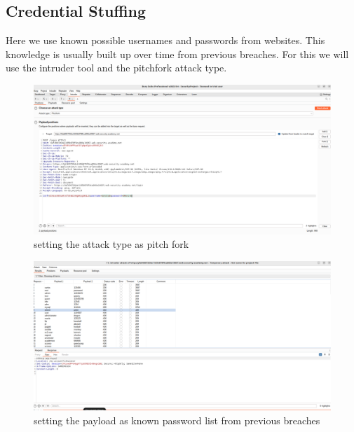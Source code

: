 \documentclass[
	a4paper, %
	12pt, %
]{CSSullivanBusinessReport}
\begin{document}
\subsection*{Credential Stuffing}
\begin{fullwidth}
    Here we use known possible usernames and passwords from websites. This knowledge is usually built up over time from previous breaches. For this we will use the intruder tool and the pitchfork attack type.

    
 \begin{figure}[H]
    \centering
    \includegraphics[width=1\textwidth]{Images/anikaScreensots/credentialStuffin1.png}
    \caption{setting the attack type as pitch fork }
    \label{fig:enter-label}
\end{figure}

 \begin{figure}[H]
    \centering
    \includegraphics[width=1\textwidth]{Images/anikaScreensots/credentialStuff3.png}
    \caption{setting the payload as known password list from previous breaches}
    \label{fig:enter-label}
\end{figure}


\end{fullwidth}
\end{document}
